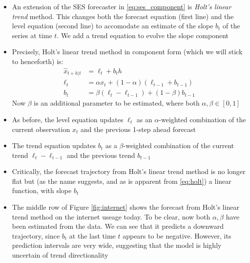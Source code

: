 \documentclass{article}
\begin{document}
\begin{itemize}
\item An extension of the SES forecaster in \eqref{eq:ses_component} is
  \emph{Holt's linear trend} method. This changes both the forecast equation
  (first line) and the level equation (second line) to accomodate an estimate of
  the slope $b_t$ of the series at time $t$. We add a trend equation to evolve
  the slope component 

\item Precisely, Holt's linear trend method in component form (which we will
  stick to henceforth) is:
  \begin{equation}
  \label{eq:holt}
  \begin{aligned}
  \hat{x}_{t+h | t} &= \ell_t + b_t h \\
  \ell_t &= \alpha x_t + (1-\alpha) (\ell_{t-1} + b_{t-1}) \\
  b_t &= \beta (\ell_t - \ell_{t-1}) + (1-\beta) b_{t-1} 
  \end{aligned}
  \end{equation}
  Now $\beta$ is an additional parameter to be estimated, where both $\alpha,
  \beta \in [0,1]$ 

\item As before, the level equation updates $\ell_t$ as an $\alpha$-weighted
  combination of the current observation $x_t$ and the previous 1-step ahead
  forecast  

\item The trend equation updates $b_t$ as a $\beta$-weighted combination of the
  current trend $\ell_t - \ell_{t-1}$ and the previous trend $b_{t-1}$

\item Critically, the forecast trajectory from Holt's linear trend method is no
  longer flat but (as the name suggests, and as is apparent from
  \eqref{eq:holt}) a linear function, with slope $b_t$

\item The middle row of Figure \ref{fig:internet} shows the forecast from Holt's
  linear trend method on the internet useage today. To be clear, now both
  $\alpha,\beta$ have been estimated from the data. We can see that it predicts
  a downward trajectory, since $b_t$ at the last time $t$ appears to be
  negative. However, its prediction intervals are very wide, suggesting that the 
  model is highly uncertain of trend directionality  
\end{itemize}
\end{document}
